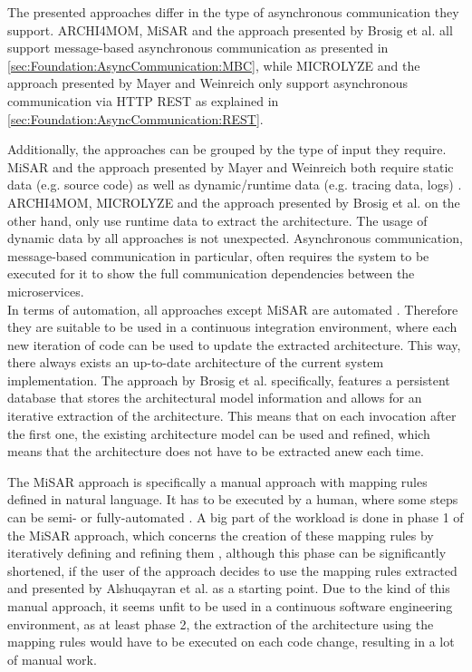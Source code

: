 The presented approaches differ in the type of asynchronous communication they support.
ARCHI4MOM, MiSAR and the approach presented by Brosig et al. all support message-based asynchronous communication as presented in \autoref{sec:Foundation:AsyncCommunication:MBC}, while MICROLYZE and the approach presented by Mayer and Weinreich only support asynchronous communication via HTTP REST as explained in \autoref{sec:Foundation:AsyncCommunication:REST}.

Additionally, the approaches can be grouped by the type of input they require.
MiSAR and the approach presented by Mayer and Weinreich both require static data (e.g. source code) as well as dynamic/runtime data (e.g. tracing data, logs) \cite{Alshuqayran2018MiSAR,Mayer2018}.
ARCHI4MOM, MICROLYZE and the approach presented by Brosig et al. on the other hand, only use runtime data to extract the architecture.
The usage of dynamic data by all approaches is not unexpected.
Asynchronous communication, message-based communication in particular, often requires the system to be executed for it to show the full communication dependencies between the microservices. 
\\

In terms of automation, all approaches except MiSAR are automated \cite{Singh2022ARCHI4MOM,Brosig2011,Mayer2018,Kleehaus2018}.
Therefore they are suitable to be used in a continuous integration environment, where each new iteration of code can be used to update the extracted architecture.
This way, there always exists an up-to-date architecture of the current system implementation.
The approach by Brosig et al. specifically, features a persistent database that stores the architectural model information \cite{Brosig2011} and allows for an iterative extraction of the architecture.
This means that on each invocation after the first one, the existing architecture model can be used and refined, which means that the architecture does not have to be extracted anew each time.

The MiSAR approach is specifically a manual approach with mapping rules defined in natural language.
It has to be executed by a human, where some steps can be semi- or fully-automated \cite{Alshuqayran2020Thesis}.
A big part of the workload is done in phase 1 of the MiSAR approach, which concerns the creation of these mapping rules by iteratively defining and refining them \cite{Alshuqayran2018MiSAR}, although this phase can be significantly shortened, if the user of the approach decides to use the mapping rules extracted and presented by Alshuqayran et al. as a starting point.
Due to the kind of this manual approach, it seems unfit to be used in a continuous software engineering environment, as at least phase 2, the extraction of the architecture using the mapping rules would have to be executed on each code change, resulting in a lot of manual work.
\\

